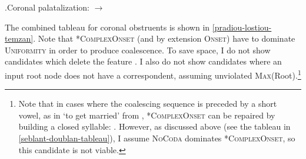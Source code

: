 \ex.\label{ex:st-sts}Coronal palatalization:  $\rightarrow$ \ipa{[sʧ]}\\

The combined tableau for coronal obstruents is shown in \ref{pradiou-lostiou-temzan}. Note that *\textsc{ComplexOnset} (and by extension \textsc{Onset}) have to dominate \textsc{Uniformity} in order to produce coalescence. To save space, I do not show candidates which delete the feature . I also do not show candidates where an input root node does not have a correspondent, assuming unviolated \textsc{Max}(Root).\footnote{Note that in cases where the coalescing sequence is preceded by a short vowel, as in \ipa{[ˈøːrəʒo]} `to get married' from , *\textsc{ComplexOnset} can be repaired by building a closed syllable: . However, as discussed above (see the tableau in \ref{seblant-doublan-tableau}), I assume \textsc{NoCoda} dominates *\textsc{ComplexOnset}, so this candidate is not viable.}

